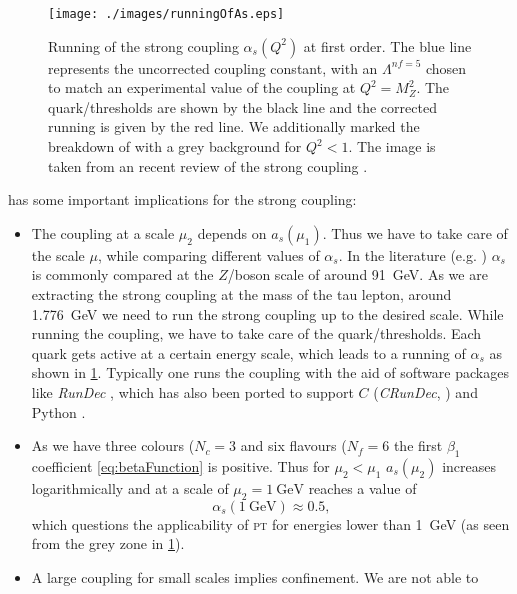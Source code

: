 \documentclass[../../index.tex]{subfiles}
\begin{document}
\begin{figure}
  \centering \texttt{[image: ./images/runningOfAs.eps]}
  \caption{Running of the strong coupling \(\alpha_s(Q^2)\) at first order. The
    blue line represents the uncorrected coupling constant, with an
    \(\Lambda^{nf=5}\) chosen to match an experimental value of the coupling at
    \(Q^2=M_Z^2\). The quark\-/thresholds are shown by the black line and the
    corrected running is given by the red line. We additionally marked the
    breakdown of  with a grey background for \(Q^2<1\). The image is
    taken from an recent review of the strong coupling \cite{Deur2016}.}
  \label{fig:runningOfAs}
\end{figure}

 has some important implications for the
strong coupling:
\begin{itemize}
\item The coupling at a scale \(\mu_2\) depends on \(a_s(\mu_1)\). Thus we have
  to take care of the scale \(\mu\), while comparing different values of
  \(\alpha_s\). In the literature (e.g. \cite{pdg2016}) \(\alpha_s\) is commonly
  compared at the \(Z\)\-/boson scale of around \SI{91}{\giga\eV}. As we are
  extracting the strong coupling at the mass of the tau lepton, around
  \SI{1.776}{\giga\eV} we need to run the strong coupling up to the desired
  scale. While running the coupling, we have to take care of the
  quark\-/thresholds. Each quark gets active at a certain energy scale, which
  leads to a running of \(\alpha_s\) as shown in \cref{fig:runningOfAs}.
  Typically one runs the coupling with the aid of software packages like
  \textit{RunDec} \cite{Chetyrkin2000,Herren2017}, which has also been ported to
  support \(C\) (\textit{CRunDec}, \cite{Schmidt2012}) and Python
  \cite{Straub2016}.
\item As we have three colours (\(N_c=3\) and six flavours (\(N_f=6\) the first
  \(\beta_1\) coefficient \ref{eq:betaFunction} is positive. Thus for
  \(\mu_2<\mu_1\) \(a_s(\mu_2)\) increases logarithmically and at a scale of
  \(\mu_2=\SI{1}{\giga\eV}\) reaches a value of
  \begin{equation}
    \alpha_s(\SI{1}{\giga\eV}) \approx 0.5,
  \end{equation}
  which questions the applicability of \textsc{pt} for energies lower than
  \SI{1}{\giga\eV} (as seen from the grey zone in \cref{fig:runningOfAs}).
\item A large coupling for small scales implies confinement. We are not able to

\end{itemize}
\end{document}
